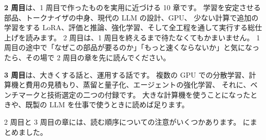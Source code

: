 \textbf{2 周目}は、1 周目で作ったものを実用に近づける 10 章です。
学習を安定させる部品、トークナイザの中身、現代の LLM の設計、GPU、
少ない計算で追加の学習をする LoRA、評価と推論、強化学習、そして全工程を通して実行する総仕上げを読みます。
2 周目は、1 周目を終えるまで待たなくてもかまいません。
1 周目の途中で「なぜこの部品が要るのか」「もっと速くならないか」と気になったら、その場で 2 周目の章を先に読んでください。

\textbf{3 周目}は、大きくする話と、運用する話です。
複数の GPU での分散学習、計算機と費用の見積もり、蒸留と量子化、エージェントの強化学習、
それに、ベンチマークと技術選定の二つの付録です。
大きな計算機を使うことになったときや、既製の LLM を仕事で使うときに読めば足ります。

2 周目と 3 周目の章には、読む順序についての注意がいくつかあります。
にまとめました。

